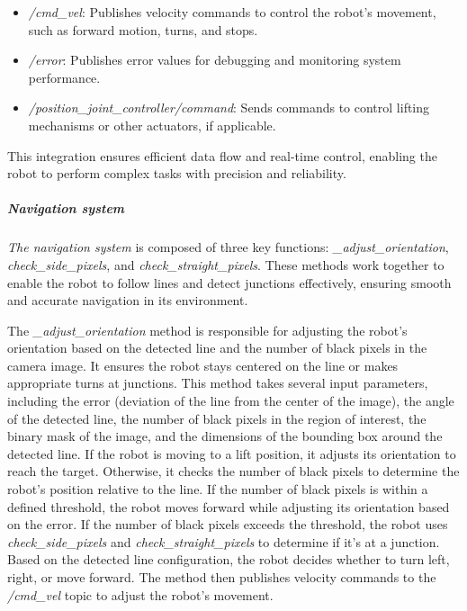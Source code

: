 \documentclass[../../main]{subfiles}
\begin{document}
\begin{itemize}
\item
  \emph{/cmd\_vel}: Publishes velocity commands to control the robot's
  movement, such as forward motion, turns, and stops.
\item
  \emph{/error}: Publishes error values for debugging and monitoring
  system performance.
\item
  \emph{/position\_joint\_controller/command}: Sends commands to control
  lifting mechanisms or other actuators, if applicable.
\end{itemize}

This integration ensures efficient data flow and real-time control,
enabling the robot to perform complex tasks with precision and
reliability.

\subparagraph{Navigation system}

\emph{The navigation system} is composed of three key functions:
\emph{\_adjust\_orientation}, \emph{check\_side\_pixels}, and
\emph{check\_straight\_pixels}. These methods work together to enable
the robot to follow lines and detect junctions effectively, ensuring
smooth and accurate navigation in its environment.

The \emph{\_adjust\_orientation} method is responsible for adjusting the
robot's orientation based on the detected line and the number of black
pixels in the camera image. It ensures the robot stays centered on the
line or makes appropriate turns at junctions. This method takes several
input parameters, including the error (deviation of the line from the
center of the image), the angle of the detected line, the number of
black pixels in the region of interest, the binary mask of the image,
and the dimensions of the bounding box around the detected line. If the
robot is moving to a lift position, it adjusts its orientation to reach
the target. Otherwise, it checks the number of black pixels to determine
the robot's position relative to the line. If the number of black pixels
is within a defined threshold, the robot moves forward while adjusting
its orientation based on the error. If the number of black pixels
exceeds the threshold, the robot uses \emph{check\_side\_pixels} and
\emph{check\_straight\_pixels} to determine if it's at a junction. Based
on the detected line configuration, the robot decides whether to turn
left, right, or move forward. The method then publishes velocity
commands to the \emph{/cmd\_vel} topic to adjust the robot's movement.
\end{document}
